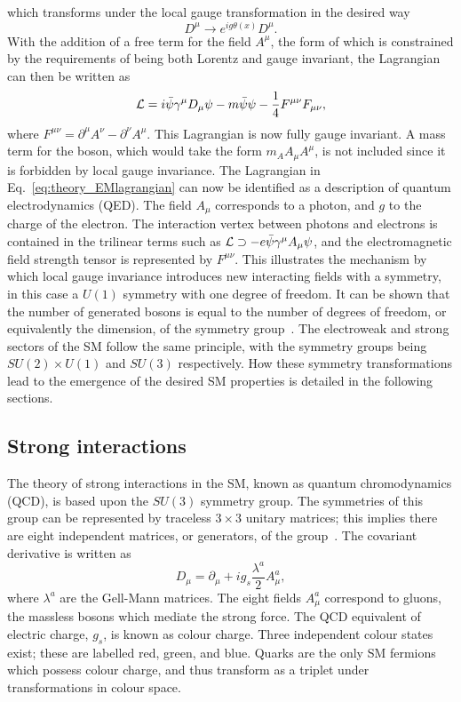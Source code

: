 which transforms under the local gauge transformation in the desired way
\begin{equation}
D^\mu \rightarrow e^{ig\theta(x)} D^\mu .
\end{equation}
With the addition of a free term for the field $A^\mu$, 
the form of which is constrained by the requirements of being both Lorentz and gauge invariant, 
the Lagrangian can then be written as
\begin{equation}
\label{eq:theory_EMlagrangian}
\mathcal{L} = i \bar{\psi} \gamma^\mu D_\mu \psi - m\bar{\psi}\psi - \frac{1}{4} F^{\mu\nu}F_{\mu\nu},
\end{equation}
where $F^{\mu\nu} = \partial^\mu A^\nu - \partial^\nu A^\mu$.
This Lagrangian is now fully gauge invariant.
A mass term for the boson, which would take the form $m_A A_\mu A^\mu$, 
is not included since it is forbidden by local gauge invariance.
The Lagrangian in Eq.~\ref{eq:theory_EMlagrangian} 
can now be identified as a description of quantum electrodynamics (QED).
The field $A_\mu$ corresponds to a photon, and $g$ to the charge of the electron.
The interaction vertex between photons and electrons is contained in the trilinear terms
such as $\mathcal{L} \supset -e \bar{\psi} \gamma^\mu A_\mu \psi$, 
and the electromagnetic field strength tensor is represented by $F^{\mu\nu}$.
This illustrates the mechanism by which local gauge invariance introduces new interacting fields
with a symmetry, in this case a $U(1)$ symmetry with one degree of freedom.
It can be shown that the number of generated bosons is equal to the number of degrees of freedom, 
or equivalently the dimension, of the symmetry group~\cite{Peskin}.
The electroweak and strong sectors of the SM follow the same principle, 
with the symmetry groups being $SU(2) \times U(1)$ and $SU(3)$ respectively.
How these symmetry transformations lead to the emergence of the desired SM properties 
is detailed in the following sections.

\subsection{Strong interactions}

The theory of strong interactions in the SM, known as quantum chromodynamics (QCD), 
is based upon the $SU(3)$ symmetry group.
The symmetries of this group can be represented by traceless $3\times3$ unitary matrices;
this implies there are eight independent matrices, or generators, of the group~\cite{Thomson}.
The covariant derivative is written as
\begin{equation}
D_\mu = \partial_\mu + i g_s \frac{\lambda^a}{2} A^a_\mu ,
\end{equation}
where $\lambda^a$ are the Gell-Mann matrices.
The eight fields $A^a_\mu$ correspond to gluons, 
the massless bosons which mediate the strong force.
The QCD equivalent of electric charge, $g_s$, is known as colour charge.
Three independent colour states exist; these are labelled red, green, and blue.
Quarks are the only SM fermions which possess colour charge, 
and thus transform as a triplet under transformations in colour space.


